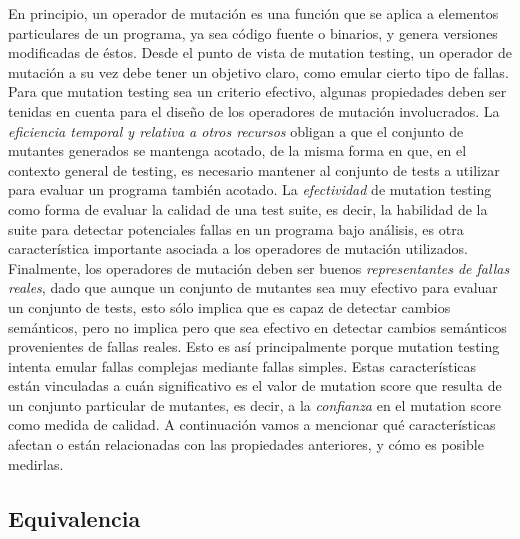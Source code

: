En principio, un operador de mutaci\'on es una funci\'on que se aplica a elementos particulares de un programa, ya sea c\'odigo fuente o binarios, y genera versiones modificadas de \'estos. Desde el punto de vista de mutation testing, un operador de mutaci\'on a su vez debe tener un objetivo claro, como emular cierto tipo de fallas. Para que mutation testing sea un criterio efectivo, algunas propiedades deben ser tenidas en cuenta para el dise\~no de los operadores de mutaci\'on involucrados. La \emph{eficiencia temporal y relativa a otros recursos} obligan a que el conjunto de mutantes generados se mantenga acotado, de la misma forma en que, en el contexto general de testing, es necesario mantener al conjunto de tests a utilizar para evaluar un programa tambi\'en acotado. La \emph{efectividad} de mutation testing como forma de evaluar la calidad de una test suite, es decir, la habilidad de la suite para detectar potenciales fallas en un programa bajo an\'alisis, es otra caracter\'istica importante asociada a los operadores de mutaci\'on utilizados. Finalmente, los operadores de mutaci\'on deben ser buenos \emph{representantes de fallas reales}, dado que aunque un conjunto de mutantes sea muy efectivo para evaluar un conjunto de tests, esto s\'olo implica que es capaz de detectar cambios sem\'anticos, pero no implica pero que sea efectivo en detectar cambios sem\'anticos provenientes de fallas reales. Esto es as\'i principalmente porque mutation testing intenta emular fallas complejas mediante fallas simples. Estas caracter\'isticas est\'an vinculadas a cu\'an significativo es el valor de mutation score que resulta de un conjunto particular de mutantes, es decir, a la \emph{confianza} en el mutation score como medida de calidad. A continuaci\'on vamos a mencionar qu\'e caracter\'isticas afectan o est\'an relacionadas con las propiedades anteriores, y c\'omo es posible medirlas.

\subsection{Equivalencia}

